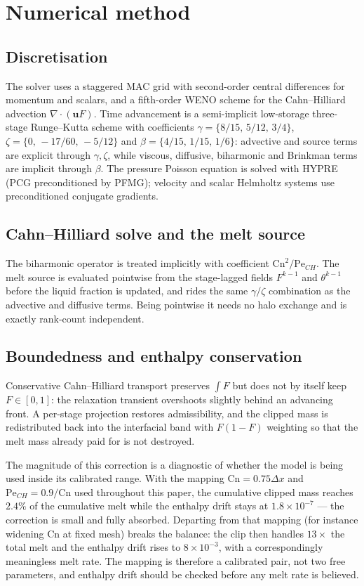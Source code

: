 \documentclass[review,12pt]{elsarticle}
\newcommand{\uvec}{\mathbf{u}}
\newcommand{\Pech}{\mathrm{Pe}_{CH}}
\begin{document}
\section{Numerical method}
\label{sec:numerics}

\subsection{Discretisation}

The solver uses a staggered MAC grid with second-order central differences for
momentum and scalars, and a fifth-order WENO scheme for the Cahn--Hilliard
advection $\nabla\cdot(\uvec F)$. Time advancement is a semi-implicit
low-storage three-stage Runge--Kutta scheme with coefficients
$\gamma = \{8/15,\,5/12,\,3/4\}$, $\zeta = \{0,\,-17/60,\,-5/12\}$ and
$\beta = \{4/15,\,1/15,\,1/6\}$: advective and source terms are explicit through
$\gamma,\zeta$, while viscous, diffusive, biharmonic and Brinkman terms are
implicit through $\beta$. The pressure Poisson equation is solved with HYPRE
(PCG preconditioned by PFMG); velocity and scalar Helmholtz systems use
preconditioned conjugate gradients.

\subsection{Cahn--Hilliard solve and the melt source}

The biharmonic operator is treated implicitly with coefficient
$\mathrm{Cn}^2/\Pech$. The melt source is evaluated pointwise from the
stage-lagged fields $F^{k-1}$ and $\theta^{k-1}$ before the liquid fraction is
updated, and rides the same $\gamma/\zeta$ combination as the advective and
diffusive terms. Being pointwise it needs no halo exchange and is exactly
rank-count independent.

\subsection{Boundedness and enthalpy conservation}
\label{sec:clip}

Conservative Cahn--Hilliard transport preserves $\int F$ but does not by itself
keep $F\in[0,1]$: the relaxation transient overshoots slightly behind an
advancing front. A per-stage projection restores admissibility, and the clipped
mass is redistributed back into the interfacial band with $F(1-F)$ weighting so
that the melt mass already paid for is not destroyed.

The magnitude of this correction is a diagnostic of whether the model is being
used inside its calibrated range. With the mapping $\mathrm{Cn} = 0.75\Delta x$
and $\Pech = 0.9/\mathrm{Cn}$ used throughout this paper, the cumulative clipped
mass reaches $2.4\%$ of the cumulative melt while the enthalpy drift stays at
$1.8\times 10^{-7}$ --- the correction is small and fully absorbed. Departing
from that mapping (for instance widening $\mathrm{Cn}$ at fixed mesh) breaks the
balance: the clip then handles $13\times$ the total melt and the enthalpy drift
rises to $8\times10^{-3}$, with a correspondingly meaningless melt rate. The
mapping is therefore a calibrated pair, not two free parameters, and enthalpy
drift should be checked before any melt rate is believed.
\end{document}
